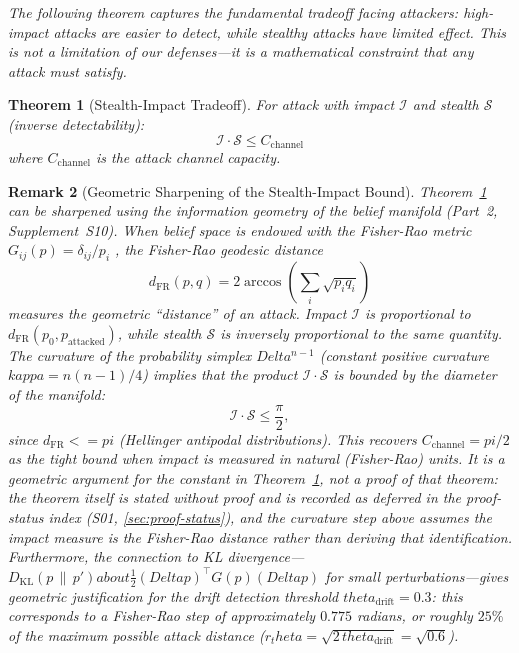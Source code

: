 \documentclass[
]{article}
\newtheorem{theorem}{Theorem}[section]
\newtheorem{remark}[theorem]{Remark}
\begin{document}
\emph{The following theorem captures the fundamental tradeoff facing
attackers: high-impact attacks are easier to detect, while stealthy
attacks have limited effect. This is not a limitation of our
defenses---it is a mathematical constraint that any attack must
satisfy.}

\begin{theorem}[Stealth-Impact Tradeoff]
\label{thm:stealth-impact}
For attack with impact $\mathcal{I}$ and stealth $\mathcal{S}$ (inverse detectability):
\begin{equation}
\label{eq:stealth-impact}
\mathcal{I} \cdot \mathcal{S} \leq C_{\text{channel}}
\end{equation}
where $C_{\text{channel}}$ is the attack channel capacity.
\end{theorem}

\begin{remark}[Geometric Sharpening of the Stealth-Impact Bound]
\label{rem:geometric-bound}
Theorem~\ref{thm:stealth-impact} can be sharpened using the information
geometry of the belief manifold (Part~2, Supplement~S10).  When belief
space is endowed with the Fisher-Rao metric
$G_{ij}(p) = \delta_{ij}/p_i$ \cite{amari2000methods}, the Fisher-Rao geodesic distance
\[
d_{\mathrm{FR}}(p, q) = 2\arccos\!\left(\sum_i \sqrt{p_i q_i}\right)
\]
measures the geometric ``distance'' of an attack.  Impact $\mathcal{I}$
is proportional to $d_{\mathrm{FR}}(p_0, p_{\text{attacked}})$, while
stealth $\mathcal{S}$ is inversely proportional to the same quantity.
The curvature of the probability simplex $Delta^{n-1}$ (constant
positive curvature $kappa = n(n-1)/4$) implies that the product
$\mathcal{I} \cdot \mathcal{S}$ is bounded by the diameter of the manifold:
\[
\mathcal{I} \cdot \mathcal{S} \leq \frac{\pi}{2},
\]
since $d_{\mathrm{FR}} <= pi$ (Hellinger antipodal distributions).
This recovers $C_{\text{channel}} = pi/2$ as the tight bound when impact
is measured in natural (Fisher-Rao) units. It is a geometric \emph{argument}
for the constant in Theorem~\ref{thm:stealth-impact}, not a proof of that
theorem: the theorem itself is stated without proof and is recorded as
deferred in the proof-status index (S01, \cref{sec:proof-status}), and the
curvature step above assumes the impact measure is the Fisher-Rao distance
rather than deriving that identification.
Furthermore, the connection to KL divergence---$D_{\mathrm{KL}}(p \,\|\, p')
about \tfrac{1}{2}(Delta p)^\top G(p)(Delta p)$ for small
perturbations---gives geometric justification for the drift detection
threshold $theta_{\text{drift}} = 0.3$: this corresponds to a
Fisher-Rao step of approximately $0.775$ radians, or roughly $25\%$ of
the maximum possible attack distance ($r_theta = \sqrt{2\,theta_{\text{drift}}} = \sqrt{0.6}$).
\end{remark}
\end{document}
